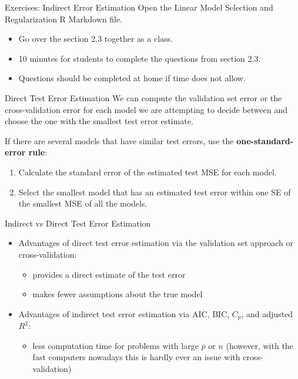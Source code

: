 \documentclass[
  ignorenonframetext,
  aspectratio=169,
]{beamer}
\providecommand{\tightlist}{%
  \setlength{\itemsep}{0pt}\setlength{\parskip}{0pt}}\usepackage{longtable,booktabs,array}
\begin{document}
\begin{frame}{Exercises: Indirect Error Estimation}
\protect\hypertarget{exercises-indirect-error-estimation}{}
Open the Linear Model Selection and Regularization R Markdown file.

\begin{itemize}
\item
  Go over the section 2.3 together as a class.
\item
  10 minutes for students to complete the questions from section 2.3.
\item
  Questions should be completed at home if time does not allow.
\end{itemize}
\end{frame}

\begin{frame}{Direct Test Error Estimation}
\protect\hypertarget{direct-test-error-estimation}{}
We can compute the validation set error or the cross-validation error
for each model we are attempting to decide between and choose the one
with the smallest test error estimate.

If there are several models that have similar test errors, use the
\textbf{one-standard-error rule}:

\begin{enumerate}
\item
  Calculate the standard error of the estimated test MSE for each model.
\item
  Select the smallest model that has an estimated test error within one
  SE of the smallest MSE of all the models.
\end{enumerate}
\end{frame}

\begin{frame}{Indirect vs Direct Test Error Estimation}
\protect\hypertarget{indirect-vs-direct-test-error-estimation}{}
\begin{itemize}
\item
  Advantages of direct test error estimation via the validation set
  approach or cross-validation:

  \begin{itemize}
  \item
    provides a direct estimate of the test error
  \item
    makes fewer assumptions about the true model
  \end{itemize}
\item
  Advantages of indirect test error estimation via AIC, BIC, \(C_p\),
  and adjusted \(R^2\):

  \begin{itemize}
  \tightlist
  \item
    less computation time for problems with large \(p\) or \(n\)
    (however, with the fast computers nowadays this is hardly ever an
    issue with cross-validation)
  \end{itemize}
\end{itemize}
\end{frame}
\end{document}
